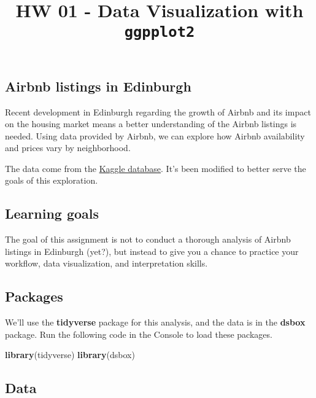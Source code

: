\documentclass[
]{article}
\title{HW 01 - Data Visualization with \texttt{ggpplot2}}
\author{}
\date{\vspace{-2.5em}}
\newenvironment{Shaded}{\begin{snugshade}}{\end{snugshade}}
\newcommand{\KeywordTok}[1]{\textcolor[rgb]{0.13,0.29,0.53}{\textbf{#1}}}
\newcommand{\NormalTok}[1]{#1}
\begin{document}
\maketitle

\hypertarget{airbnb-listings-in-edinburgh}{%
\subsection{Airbnb listings in
Edinburgh}\label{airbnb-listings-in-edinburgh}}

Recent development in Edinburgh regarding the growth of Airbnb and its
impact on the housing market means a better understanding of the Airbnb
listings is needed. Using data provided by Airbnb, we can explore how
Airbnb availability and prices vary by neighborhood.

The data come from the
\href{https://www.kaggle.com/thoroc/edinburgh-inside-airbnb/version/2}{Kaggle
database}. It's been modified to better serve the goals of this
exploration.

\hypertarget{learning-goals}{%
\subsection{Learning goals}\label{learning-goals}}

The goal of this assignment is not to conduct a thorough analysis of
Airbnb listings in Edinburgh (yet?), but instead to give you a chance to
practice your workflow, data visualization, and interpretation skills.

\hypertarget{packages}{%
\subsection{Packages}\label{packages}}

We'll use the \textbf{tidyverse} package for this analysis, and the data
is in the \textbf{dsbox} package. Run the following code in the Console
to load these packages.

\begin{Shaded}
\begin{Highlighting}[]
\KeywordTok{library}\NormalTok{(tidyverse)}
\KeywordTok{library}\NormalTok{(dsbox)}
\end{Highlighting}
\end{Shaded}

\hypertarget{data}{%
\subsection{Data}\label{data}}
\end{document}
